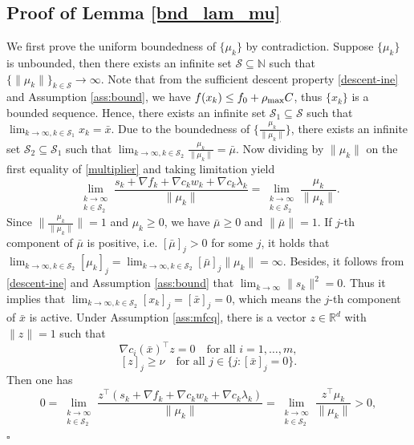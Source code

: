 \documentclass[11pt]{article}
\newenvironment{proof}{{\noindent\it Proof.}\quad}{\hfill $\square$\par}
\newcommand{\R}{\mathbb{R}}
\begin{document}
\subsection{Proof of Lemma \ref{bnd_lam_mu}}\label{proof:lmbnd}
\begin{proof}
     We first prove the uniform boundedness of  \(\{\mu_k\}\) by contradiction. Suppose \(\{\mu_k\}\) is unbounded, then there exists an  infinite set \(\mathcal S \subseteq \mathbb N\) such that \(\{\|\mu_k\|\}_{k \in \mathcal S} \to \infty\).
     Note that from the sufficient descent property \eqref{descent-ine} and Assumption \ref{ass:bound}, we have \(f(x_k) \leq f_0 + \rho_{\rm max} C\), thus \(\{x_k\}\) is a bounded sequence. Hence, there exists an infinite set \(\mathcal S_1 \subseteq  \mathcal S\) such that \(\lim_{k \to \infty, k \in \mathcal S_1} x_k = \bar x\). Due to the boundedness of  \(\{\frac{\mu_k}{\|\mu_k\|}\}\), there exists an infinite set \(\mathcal S_2 \subseteq \mathcal S_1\) such that \(\lim_{k \to \infty, k\in \mathcal S_2}\frac{\mu_k}{\|\mu_k\|} = \bar \mu\). Now
    dividing by \(\|\mu_k\|\) on the first equality of \eqref{multiplier} and taking limitation yield 
    \[
    \lim_{\substack{k \to \infty \\ k \in \mathcal S_2}} \frac{s_k + \nabla f_k + \nabla c_k w_k + \nabla c_k \lambda_k}{\|\mu_k\|} = \lim_{\substack{k \to \infty \\ k \in \mathcal S_2}} \frac{\mu_k}{\|\mu_k\|}.
    \]
    Since $\|\frac{\mu_k}{\|\mu_k\|}\|=1$ and $\mu_k\ge 0$, we have  $\bar\mu\ge0$ and $\|\bar\mu\|=1.$
    If $j$-th component of $\bar \mu$ is positive, i.e. \([\bar \mu]_j > 0\) for some $j$, it holds that \(\lim_{k \to \infty, k \in \mathcal S_2} [\mu_k]_j = \lim_{k \to \infty, k \in \mathcal S_2} [\bar \mu]_j \|\mu_k\| = \infty\). Besides, it follows from \eqref{descent-ine} and Assumption \ref{ass:bound} that \(\lim_{k \to \infty} \|s_k\|^2 = 0\).  Thus  it implies that \(\lim_{k \to \infty, k \in \mathcal S_2} [x_k]_j = [\bar x]_j = 0\), which means  the \(j\)-th component of $\bar x$ is active. Under   Assumption \ref{ass:mfcq}, there is a vector \(z \in \R^d\) with \(\|z\| = 1\) such that 
    \[
    \nabla c_i(\bar x)^\top z = 0 \quad \text{for all } i = 1, \ldots, m,
    \]
    \[
    [z]_j \ge \nu \quad \text{for all } j \in \{ j : [\bar x]_j = 0 \}.
    \]
    Then one has
    \[
    0 = \lim_{\substack{k \to \infty \\ k \in \mathcal S_2}} \frac{z^\top (s_k + \nabla f_k + \nabla c_k w_k + \nabla c_k \lambda_k)}{\|\mu_k\|} = \lim_{\substack{k \to \infty \\ k \in \mathcal S_2}} \frac{z^\top \mu_k}{\|\mu_k\|} > 0,
\]
\end{proof}
\end{document}
